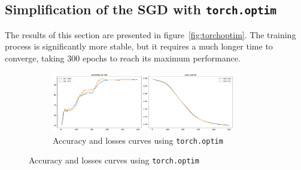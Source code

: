 \subsection{Simplification of the SGD with \texttt{torch.optim}}

The results of this section are presented in figure~\ref{fig:torchoptim}. The training process is significantly more stable, but it requires a much longer time to converge, taking 300 epochs to reach its maximum performance. 

\begin{figure}[H]
    \centering
    \begin{subfigure}{\textwidth}
        \centering
        \includegraphics[width=0.88\textwidth]{figs/NN/torchoptim_acc_loss.pdf}
        \caption{Accuracy and losses curves using \texttt{torch.optim}}
        \label{subfig:torchoptim_acc_loss}
    \end{subfigure}
\end{figure}

